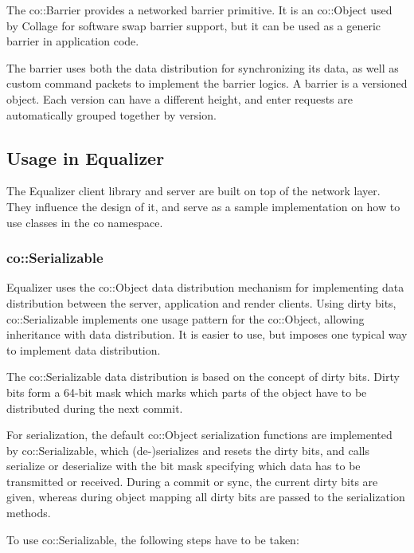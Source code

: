 \documentclass[10pt,a4]{scrartcl}
\begin{document}
The \textsf{co::Barrier} provides a networked barrier primitive. It is an
\textsf{co::Object} used by Collage for software swap barrier support, but it
can be used as a generic barrier in application code.

The barrier uses both the data distribution for synchronizing its data,
as well as custom command packets to implement the barrier logics. A
barrier is a versioned object. Each version can have a different height,
and enter requests are automatically grouped together by version.


\subsection{\label{sNetUsage}Usage in Equalizer}

The Equalizer client library and server are built on top of the network
layer. They influence the design of it, and serve as a sample
implementation on how to use classes in the \textsf{co} namespace.

\subsubsection{\label{sEqObject}co::Serializable}

Equalizer uses the \textsf{co::Object} data distribution mechanism for
implementing data distribution between the server, application and render
clients. Using dirty bits, \textsf{co::Serializable} implements one
usage pattern for the \textsf{co::Object}, allowing inheritance with data
distribution. It is easier to use, but imposes one typical way to implement data
distribution.

The \textsf{co::Serializable} data distribution is based on the concept
of dirty bits. Dirty bits form a 64-bit mask which marks which parts of the
object have to be distributed during the next commit.

For serialization, the default \textsf{co::Object} serialization functions are
implemented by \textsf{co::Serializable}, which (de-)serializes and
resets the dirty bits, and calls \textsf{serialize} or \textsf{deserialize} with
the bit mask specifying which data has to be transmitted or received. During a
commit or sync, the current dirty bits are given, whereas during object mapping
all dirty bits are passed to the serialization methods.

To use \textsf{co::Serializable}, the following steps have to be taken:
\end{document}
